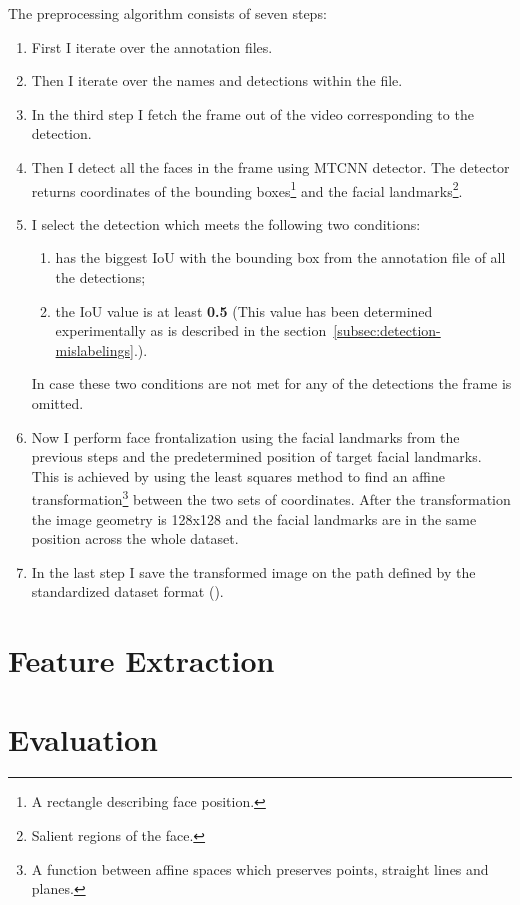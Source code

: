 The preprocessing algorithm consists of seven steps:
\begin{enumerate}
    \item First I iterate over the annotation files.
    \item Then I iterate over the names and detections within the file.
    \item In the third step I fetch the frame out of the video corresponding to the detection.
    \item Then I detect all the faces in the frame using MTCNN detector.
    The detector returns coordinates of the bounding boxes\footnote{A rectangle describing face position.} and the
    facial landmarks\footnote{Salient regions of the face.}.
    \item I select the detection which meets the following two conditions:
    \begin{enumerate}
        \item has the biggest IoU with the bounding box from the annotation file of all the detections;
        \item the IoU value is at least \textbf{0.5} (This value has been determined experimentally as
        is described in the section~\ref{subsec:detection-mislabelings}.).
    \end{enumerate}
    In case these two conditions are not met for any of the detections the frame is omitted.
    \item Now I perform face frontalization using the facial landmarks from the previous steps and the predetermined
    position of target facial landmarks.
    This is achieved by using the least squares method to find an affine transformation\footnote{A function between
    affine spaces which preserves points, straight lines and planes.} between the two sets of coordinates.
    After the transformation the image geometry is 128x128 and the facial landmarks are in the same position across
    the whole dataset.
    \item In the last step I save the transformed image on the path defined by the standardized dataset format
    ().
\end{enumerate}

\section{Feature Extraction}\label{sec:feature-extraction}

\section{Evaluation}\label{sec:evaluation}

